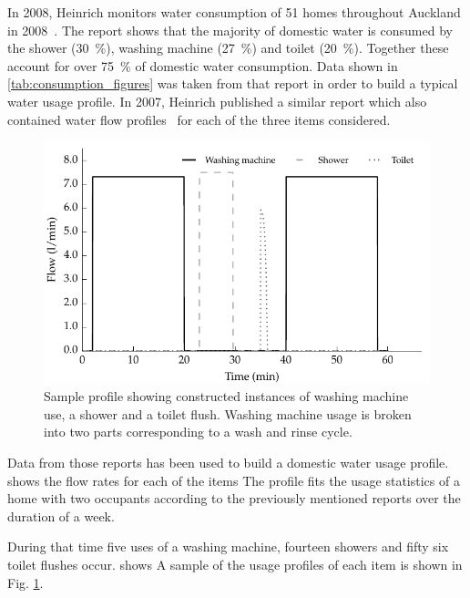     In 2008, Heinrich monitors water consumption of 51 homes throughout Auckland in 2008~\cite{Heinrich2008}.
    The report shows that the majority of domestic water is consumed by the shower (\SI{30}{\percent}), washing machine (\SI{27}{\percent}) and toilet (\SI{20}{\percent}).
    Together these account for over \SI{75}{\percent} of domestic water consumption.
    Data shown in \cref{tab:consumption_figures} was taken from that report in order to build a typical water usage profile.
    In 2007, Heinrich published a similar report which also contained water flow profiles~\cite{Heinrich2007} for each of the three items considered.

    \begin{figure}
      \centering
      \includegraphics[width=\linewidth]{content/pt1/02-WirelessWaterMeter/graphics/graph_profile}
      \caption{Sample profile showing constructed instances of washing machine use, a shower and a toilet flush.
      Washing machine usage is broken into two parts corresponding to a wash and rinse cycle.}
      \label{fig:profileSample}
    \end{figure}

    Data from those reports has been used to build a domestic water usage profile.
     shows the flow rates for each of the items
    The profile fits the usage statistics of a home with two occupants according to the previously mentioned reports over the duration of a week.

    During that time five uses of a washing machine, fourteen showers and fifty six toilet flushes occur.
     shows
    A sample of the usage profiles of each item is shown in Fig. \ref{fig:profileSample}.

